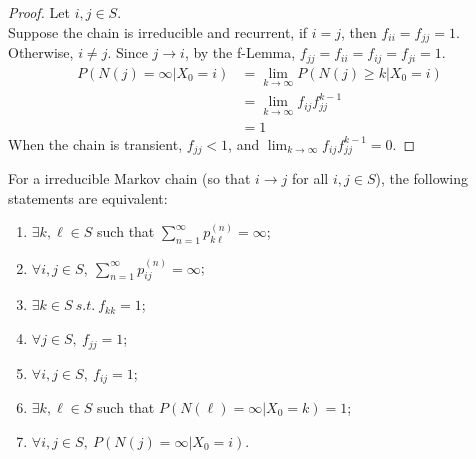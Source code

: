 \documentclass{article}
\newcommand{\upn}[0]{^{(n)}}
\begin{document}
    \begin{proof}
    	Let $i, j \in S$. \\
    	Suppose the chain is irreducible and recurrent, if $i = j$, then $f_{ii} = f_{jj} = 1$. \\
    	Otherwise, $i \neq j$. Since $j \to i$, by the f-Lemma, $f_{jj} = f_{ii} = f_{ij} = f_{ji} = 1$.
    	\begin{align}
    		P(N(j) = \infty | X_0 = i)
    		&= \lim_{k \to \infty} P(N(j) \geq k | X_0 = i) \\
    		&= \lim_{k \to \infty} f_{ij} f_{jj}^{k-1} \\
    		&= 1
    	\end{align}
    	When the chain is transient, $f_{jj} < 1$, and $\lim_{k \to \infty} f_{ij} f_{jj}^{k-1} = 0$.
    \end{proof}
    
    \begin{theorem}
    	For a irreducible Markov chain (so that $i \to j$ for all $i, j \in S$), the following statements are equivalent:
    	\begin{enumerate}[(1)]
    		\item $\exists k, \ell \in S$ such that $\sum_{n=1}^\infty p_{k \ell}\upn = \infty$;
    		\item $\forall i,j \in S,\ \sum_{n=1}^\infty p_{ij}\upn = \infty$;
    		\item $\exists k \in S\ s.t.\ f_{kk} = 1$;
    		\item $\forall j \in S,\ f_{jj} = 1$;
    		\item $\forall i,j \in S,\ f_{ij} = 1$;
    		\item $\exists k, \ell \in S$ such that $P(N(\ell) = \infty | X_0 = k) = 1$;
    		\item $\forall i, j \in S,\ P(N(j) = \infty | X_0 = i)$.
    	\end{enumerate}
    \end{theorem}
\end{document}
